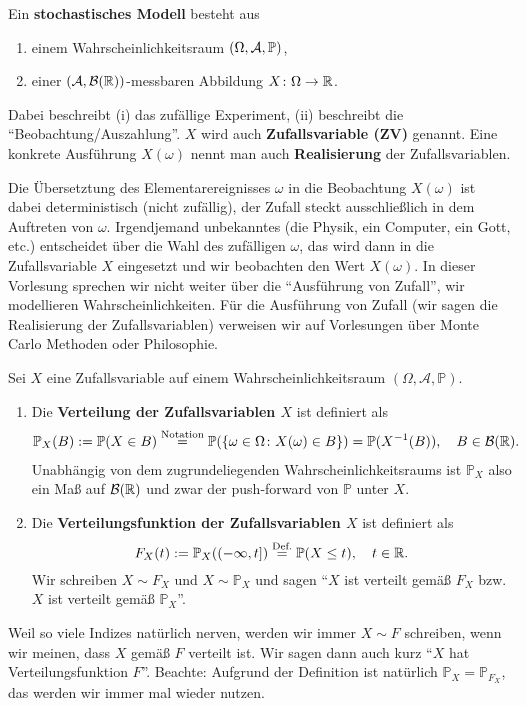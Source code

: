 \begin{deff}
	Ein \textbf{stochastisches Modell} besteht aus
	\begin{enumerate}[label=(\roman*)]
		\item einem Wahrscheinlichkeitsraum $(\Omega, \mathcal{A}, \mathbb{P})$,
		\item einer $(\mathcal{A}, \mathcal{B}(\mathbb{R}))$-messbaren Abbildung $X\colon \Omega \to \mathbb{R}$.
	\end{enumerate}
	Dabei beschreibt (i) das zuf\"allige Experiment, (ii) beschreibt die \enquote{Beobachtung/Auszahlung}. $X$ wird auch \textbf{Zufallsvariable (ZV)} genannt. Eine konkrete Ausf\"uhrung $X(\omega)$ nennt man auch \textbf{Realisierung} der Zufallsvariablen. 
\end{deff}
Die \"Ubersetztung des Elementarereignisses $\omega$ in die Beobachtung $X(\omega)$ ist dabei deterministisch (nicht zuf\"allig), der Zufall steckt ausschlie\ss lich in dem Auftreten von $\omega$. Irgendjemand unbekanntes (die Physik, ein Computer, ein Gott, etc.) entscheidet \"uber die Wahl des zuf\"alligen $\omega$, das wird dann in die Zufallsvariable $X$ eingesetzt und wir beobachten den Wert $X(\omega)$. In dieser Vorlesung sprechen wir nicht weiter \"uber die \enquote{Ausf\"uhrung von Zufall}, wir modellieren Wahrscheinlichkeiten. F\"ur die Ausf\"uhrung von Zufall (wir sagen die Realisierung der Zufallsvariablen) verweisen wir auf Vorlesungen \"uber Monte Carlo Methoden oder Philosophie.
\begin{deff}\label{df}
Sei $X$ eine Zufallsvariable auf einem Wahrscheinlichkeitsraum $(\Omega, \mathcal A, \mathbb P)$.
	\begin{enumerate}[label=(\roman*)]
		\item Die \textbf{Verteilung der Zufallsvariablen $X$} ist definiert als
		\begin{gather*}
			\mathbb{P}_X (B) := \mathbb{P} (X \in B) \overset{\text{Notation}}{=} \mathbb{P}(\{ \omega \in \Omega \colon X(\omega) \in B \}) =\mathbb{P}(X^{-1}(B)), \quad B \in \mathcal{B}(\mathbb{R}).
		\end{gather*}
		Unabh\"angig von dem zugrundeliegenden Wahrscheinlichkeitsraums ist $ \mathbb{P}_X $ also ein Maß auf $ \mathcal{B}(\mathbb{R}) $ und zwar der push-forward von $\mathbb P$ unter $X$.
		\item Die \textbf{Verteilungsfunktion der Zufallsvariablen $X$} ist definiert als
		\[ F_X(t) := \mathbb{P}_X((-\infty,t]) \overset{\text{Def.}}{=} \mathbb{P}(X \leq t), \quad t \in \mathbb{R}. \]
		Wir schreiben $X \sim F_X$ und $X \sim \mathbb{P}_X$ und sagen \enquote{$X$ ist verteilt gemäß $F_X$ bzw. $X$ ist verteilt gem\"a\ss{} $\mathbb P_X$}.
	\end{enumerate}
	 Weil so viele Indizes nat\"urlich nerven, werden wir immer $X\sim F$ schreiben, wenn wir meinen, dass $X$ gem\"a\ss{} $F$ verteilt ist.  Wir sagen dann auch kurz \enquote{$X$ hat Verteilungsfunktion $F$}.
	 Beachte: Aufgrund der Definition ist nat\"urlich $\mathbb P_X=\mathbb P_{F_X}$, das werden wir immer mal wieder nutzen.
\end{deff}

